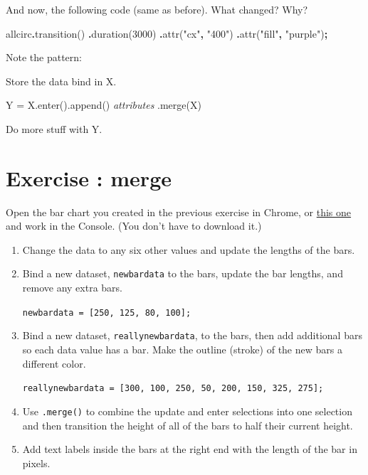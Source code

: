 \documentclass[
  openany]{book}
\newenvironment{Shaded}{\begin{snugshade}}{\end{snugshade}}
\newcommand{\DecValTok}[1]{\textcolor[rgb]{0.00,0.00,0.81}{#1}}
\newcommand{\FunctionTok}[1]{\textcolor[rgb]{0.00,0.00,0.00}{#1}}
\newcommand{\NormalTok}[1]{#1}
\newcommand{\OperatorTok}[1]{\textcolor[rgb]{0.81,0.36,0.00}{\textbf{#1}}}
\newcommand{\StringTok}[1]{\textcolor[rgb]{0.31,0.60,0.02}{#1}}
\begin{document}
And now, the following code (same as before). What changed? Why?

\begin{Shaded}
\begin{Highlighting}[]
\NormalTok{allcirc}\OperatorTok{.}\FunctionTok{transition}\NormalTok{() }
        \OperatorTok{.}\FunctionTok{duration}\NormalTok{(}\DecValTok{3000}\NormalTok{)}
        \OperatorTok{.}\FunctionTok{attr}\NormalTok{(}\StringTok{"cx"}\OperatorTok{,} \StringTok{"400"}\NormalTok{)}
        \OperatorTok{.}\FunctionTok{attr}\NormalTok{(}\StringTok{"fill"}\OperatorTok{,} \StringTok{"purple"}\NormalTok{)}\OperatorTok{;}
\end{Highlighting}
\end{Shaded}

Note the pattern:

Store the data bind in X.

Y = X.enter().append() \emph{attributes} .merge(X)

Do more stuff with Y.

\hypertarget{exercise-merge}{%
\section{Exercise : merge}\label{exercise-merge}}

Open the bar chart you created in the previous exercise in Chrome, or \href{code/horiz_bar.html}{this one} and work in the Console. (You don't have to download it.)

\begin{enumerate}
\def\labelenumi{\arabic{enumi}.}
\item
  Change the data to any six other values and update the lengths of the bars.
\item
  Bind a new dataset, \texttt{newbardata} to the bars, update the bar lengths, and remove any extra bars.

  \texttt{newbardata\ =\ {[}250,\ 125,\ 80,\ 100{]};}
\item
  Bind a new dataset, \texttt{reallynewbardata}, to the bars, then add additional bars so each data value has a bar. Make the outline (stroke) of the new bars a different color.

  \texttt{reallynewbardata\ =\ {[}300,\ 100,\ 250,\ 50,\ 200,\ 150,\ 325,\ 275{]};}
\item
  Use \texttt{.merge()} to combine the update and enter selections into one selection and then transition the height of all of the bars to half their current height.
\item
  Add text labels inside the bars at the right end with the length of the bar in pixels.
\end{enumerate}
\end{document}

